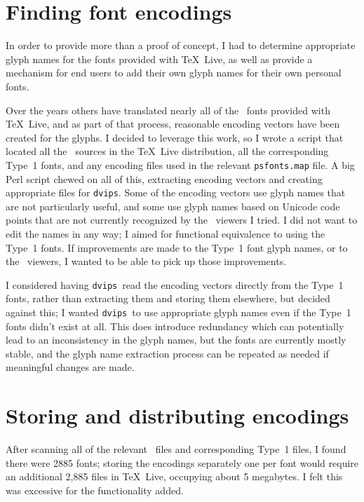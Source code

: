 \documentclass[final]{ltugboat}
\def\PDF{\acro{PDF}}
\def\dvips{\texttt{dvips}}
\begin{document}
\section{Finding font encodings}

In order to provide more than a proof of concept, I had to
determine appropriate glyph names for the fonts provided with
\TeX\ Live, as well as provide a mechanism for end users to add their
own glyph names for their own personal fonts.

Over the years others have translated nearly all
of the \MF\ fonts
provided with \TeX~Live,
and as part of that process, reasonable
encoding vectors have been created for the glyphs.  I
decided to leverage this work, so I wrote a
script that located all the \MF\ sources in the \TeX~Live
distribution, all the corresponding Type~1 fonts, and any
encoding files used in the relevant \texttt{psfonts.map}
file.  A big Perl script chewed on all of this, extracting
encoding vectors and creating appropriate files for
\dvips.  Some of
the encoding vectors use glyph names that are not particularly
useful, and some use glyph names based on Unicode code
points that are not currently recognized by the \PDF\ viewers
I tried.  I did not want to edit the names in any way;
I aimed for functional equivalence to using the Type~1
fonts.  If improvements are made to the Type~1 font glyph
names, or to the \PDF\ viewers, I wanted to be able to pick
up those improvements.

I considered having \dvips\ read the encoding vectors
directly from the Type~1 fonts, rather than extracting them
and storing them elsewhere, but decided against this; I wanted
\dvips\ to use appropriate glyph names even if the Type~1
fonts didn't exist at all.  This does introduce
redundancy which can potentially lead to an inconsistency in
the glyph names, but the fonts are currently mostly stable, and
the glyph name extraction process can be
repeated as needed if meaningful changes are made.

\section{Storing and distributing encodings}

After scanning all of the relevant \MF\ files and corresponding
Type~1 files, I found there were 2885 fonts; storing the
encodings separately one per font would require an additional
2,885 files in \TeX~Live, occupying about 5 megabytes.  I felt
this was excessive for the functionality added.
\end{document}
